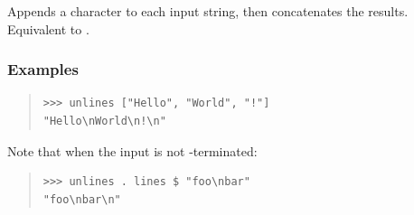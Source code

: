 \begin{haddockdesc}
\item[\begin{tabular}{@{}l}
unlines :: {\char 91}String{\char 93} -> String
\end{tabular}]
{\haddockbegindoc
Appends a  character to each input string, then concatenates the
 results. Equivalent to .\par
\subsubsection*{\textbf{Examples}}
\begin{quote}
{\haddockverb\begin{verbatim}
>>> unlines ["Hello", "World", "!"]
"Hello\nWorld\n!\n"

\end{verbatim}}
\end{quote}
Note that  when the input is not -terminated:\par
\begin{quote}
{\haddockverb\begin{verbatim}
>>> unlines . lines $ "foo\nbar"
"foo\nbar\n"

\end{verbatim}}
\end{quote}}
\end{haddockdesc}
